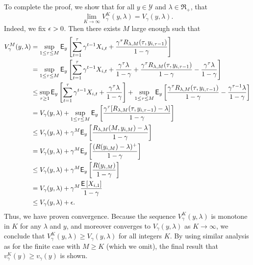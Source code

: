 \begin{myproof}[Proof.]
	To complete the proof, we show that for all $y \in \mathcal{Y}$ and $\lambda \in \Re_+$, that 
	\[
	\lim_{K \to \infty}V^K_\gamma(y, \lambda) = V_\gamma(y, \lambda).
	\]
	Indeed, we fix $\epsilon > 0$. Then there exists $M$ large enough such that
	\begin{align*}
		V^M_\gamma(y, \lambda) & = \sup_{1 \le \tau \le M} \mathsf{E}_y\left[\sum_{t=1}^{\tau} \gamma^{t-1} X_{i,t} + \frac{\gamma^{\tau}R_{\lambda,M}(\tau, y_{i,\tau-1})}{1-\gamma}\right] \\
		& = \sup_{1 \le \tau \le M} \mathsf{E}_y\left[\sum_{t=1}^{\tau} \gamma^{t-1} X_{i,t} + \frac{\gamma^{\tau}\lambda}{1-\gamma} + \frac{\gamma^{\tau}R_{\lambda,M}(\tau, y_{i,\tau-1})}{1-\gamma} - \frac{\gamma^{\tau}\lambda}{1-\gamma}\right] \\
		& \le \sup_{\tau \ge 1} \mathsf{E}_y\left[\sum_{t=1}^{\tau } \gamma^{t-1} X_{i,t} + \frac{\gamma^{\tau}\lambda}{1-\gamma}\right] + \sup_{1 \le \tau \le M}\mathsf{E}_y\left[\frac{\gamma^{\tau}R_{\lambda,M}(\tau, y_{i,\tau-1})}{1-\gamma} - \frac{\gamma^{\tau -1}\lambda}{1-\gamma}\right] \\
		& =V_{\gamma}(y, \lambda) + \sup_{1 \le \tau \le M}\mathsf{E}_y\left[\frac{\gamma^{\tau}[R_{\lambda,M}(\tau, y_{i,\tau-1})-\lambda]}{1-\gamma}\right] \\
		& \le V_{\gamma}(y, \lambda)  + \gamma^{M}\mathsf{E}_y\left[\frac{R_{\lambda,M}(M, y_{i,M})-\lambda}{1-\gamma}\right] \\
		& = V_{\gamma}(y, \lambda)  + \gamma^{M}\mathsf{E}_y\left[\frac{( R(y_{i,M}) - \lambda)^+}{1-\gamma}\right] \\
		& \le V_{\gamma}(y, \lambda)  + \gamma^{M}\mathsf{E}_y\left[\frac{R(y_{i,M})}{1-\gamma}\right]  \\
		& = V_{\gamma}(y, \lambda)  + \gamma^M \frac{\mathsf{E} \left[ X_{i,1} \right]}{1-\gamma} \\
		& \le V_{\gamma}(y, \lambda)  + \epsilon.
	\end{align*}
	Thus, we have proven convergence. Because the sequence $V^K_\gamma(y, \lambda)$ is monotone in $K$ for any $\lambda$ and $y$, and moreover converges to $V_\gamma(y, \lambda)$ as $K \to \infty$, we conclude that $V^K_\gamma(y, \lambda) \ge V_\gamma(y, \lambda)$ for all integers $K$. By using similar analysis as for the finite case with $M \ge K$ (which we omit), the final result that $v^K_\gamma(y) \ge v_\gamma(y)$ is shown.
\end{myproof}



